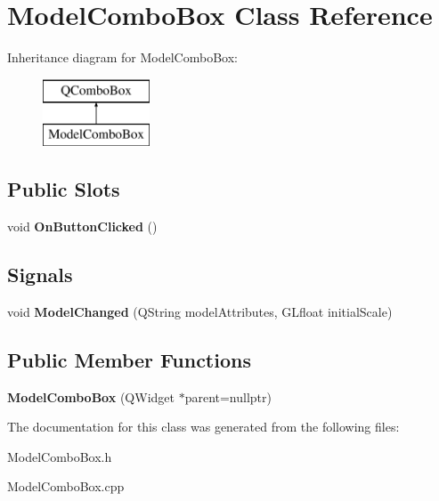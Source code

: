\hypertarget{class_model_combo_box}{}\section{Model\+Combo\+Box Class Reference}
\label{class_model_combo_box}
Inheritance diagram for Model\+Combo\+Box\+:\begin{figure}[H]
\begin{center}
\leavevmode
\includegraphics[height=2.000000cm]{class_model_combo_box}
\end{center}
\end{figure}
\subsection*{Public Slots}
\begin{DoxyCompactItemize}
\item 
\hypertarget{class_model_combo_box_ac45a64e2c5ab7232c5dc99ef3eccd154}{}void {\bfseries On\+Button\+Clicked} ()\label{class_model_combo_box_ac45a64e2c5ab7232c5dc99ef3eccd154}

\end{DoxyCompactItemize}
\subsection*{Signals}
\begin{DoxyCompactItemize}
\item 
\hypertarget{class_model_combo_box_aa521cbde3c50231f37ed0cf287bdcb1e}{}void {\bfseries Model\+Changed} (Q\+String model\+Attributes, G\+Lfloat initial\+Scale)\label{class_model_combo_box_aa521cbde3c50231f37ed0cf287bdcb1e}

\end{DoxyCompactItemize}
\subsection*{Public Member Functions}
\begin{DoxyCompactItemize}
\item 
\hypertarget{class_model_combo_box_ac9c23e7ee48e1e04361c5f1bea08815c}{}{\bfseries Model\+Combo\+Box} (Q\+Widget $\ast$parent=nullptr)\label{class_model_combo_box_ac9c23e7ee48e1e04361c5f1bea08815c}

\end{DoxyCompactItemize}


The documentation for this class was generated from the following files\+:\begin{DoxyCompactItemize}
\item 
Model\+Combo\+Box.\+h\item 
Model\+Combo\+Box.\+cpp\end{DoxyCompactItemize}
